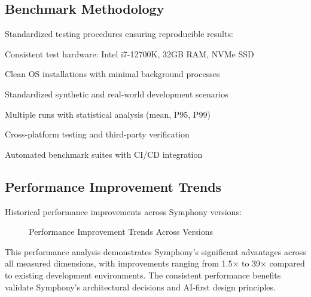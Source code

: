 \subsection*{Benchmark Methodology}

Standardized testing procedures ensuring reproducible results:

\begin{description}[leftmargin=4cm,labelwidth=3.5cm]
\item[\textbf{Hardware}] Consistent test hardware: Intel i7-12700K, 32GB RAM, NVMe SSD
\item[\textbf{Environment}] Clean OS installations with minimal background processes
\item[\textbf{Workloads}] Standardized synthetic and real-world development scenarios
\item[\textbf{Measurements}] Multiple runs with statistical analysis (mean, P95, P99)
\item[\textbf{Validation}] Cross-platform testing and third-party verification
\item[\textbf{Automation}] Automated benchmark suites with CI/CD integration
\end{description}

\subsection*{Performance Improvement Trends}

Historical performance improvements across Symphony versions:

\begin{figure}[htb]
\centering
{}
\caption{Performance Improvement Trends Across Versions}
\label{fig:performance-trends}
\end{figure}

This performance analysis demonstrates Symphony's significant advantages across all measured dimensions, with improvements ranging from 1.5× to 39× compared to existing development environments. The consistent performance benefits validate Symphony's architectural decisions and AI-first design principles.
